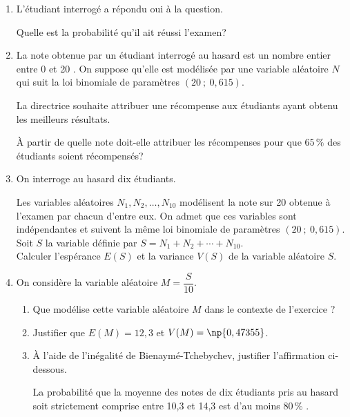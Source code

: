 \begin{enumerate}
\begin{enumerate}
		\item  Montrer que $x=0,9$.
	\end{enumerate}

	\item L'étudiant interrogé a répondu \og oui\fg{}  à la question.
	
Quelle est la probabilité qu'il ait réussi l'examen?

	\item La note obtenue par un étudiant interrogé au hasard est un nombre entier entre 0 et 20 . On suppose qu'elle est modélisée par une variable aléatoire $N$ qui suit la loi binomiale de paramètres $(20 ~;~0,615)$.
	
	La directrice souhaite attribuer une récompense aux étudiants ayant
obtenu les meilleurs résultats.

À partir de quelle note doit-elle attribuer les récompenses pour que $65\,\%$ des étudiants soient récompensés?

	\item On interroge au hasard dix étudiants.
	
Les variables aléatoires $N_{1}, N_{2}, \ldots, N_{10}$ modélisent la note sur 20 obtenue à l'examen par chacun d'entre eux. On admet que ces variables sont indépendantes et suivent la même loi binomiale de paramètres $(20 ~;~ 0,615)$.\\
	Soit $S$ la variable définie par $S=N_{1}+N_{2}+\cdots+N_{10}$.\\
	Calculer l'espérance $E(S)$ et la variance $V(S)$ de la variable aléatoire $S$.


	\item On considère la variable aléatoire $M=\dfrac{S}{10}$.
	\begin{enumerate}
		\item Que modélise cette variable aléatoire $M$ dans le contexte de l'exercice ?
		\item Justifier que $E(M)=12,3$ et $V(M)=\np{0,47355}$.
		\item À l'aide de l'inégalité de Bienaymé-Tchebychev, justifier l'affirmation ci-dessous.

\smallskip

\og La probabilité que la moyenne des notes de dix étudiants pris au hasard soit strictement comprise entre 10,3 et 14,3 est d'au moins $80\,\%$ \fg.
	\end{enumerate}
\end{enumerate}

\medskip
